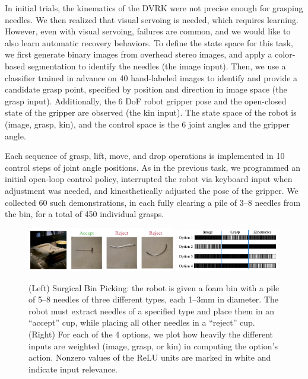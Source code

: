 In initial trials, the kinematics of the DVRK were not precise enough for grasping needles.
We then realized that visual servoing is needed, which requires learning.
However, even with visual servoing, failures are common, and we would like to also learn automatic recovery behaviors. 
To define the state space for this task, we first generate binary images from overhead stereo images, and apply a color-based segmentation to identify the needles (the \textsf{image} input).
Then, we use a classifier trained in advance on 40 hand-labeled images to identify and provide a candidate grasp point, specified by position and direction in image space (the \textsf{grasp} input). 
Additionally, the 6 DoF robot gripper pose and the open-closed state of the gripper are observed (the \textsf{kin} input).
The state space of the robot is (\textsf{image}, \textsf{grasp}, \textsf{kin}), and the control space is the 6 joint angles and the gripper angle.

Each sequence of grasp, lift, move, and drop operations is implemented in 10 control steps of joint angle positions.
As in the previous task,  we programmed an initial open-loop control policy, interrupted the robot via keyboard input when adjustment was needed, and kinesthetically adjusted the pose of the gripper. 
We collected 60 such demonstrations, in each fully clearing a pile of 3--8 needles from the bin, for a total of 450 individual grasps.


\begin{figure}[ht!]
    \includegraphics[width=0.58\textwidth]{ddco-experiments/needle-sorting2.png}
    \includegraphics[width=0.4\textwidth]{ddco-experiments/ReLU-dvrk-options.png}
    \caption{(Left) Surgical Bin Picking: the robot is given a foam bin with a pile of 5--8 needles of three different types, each 1--3mm in diameter. The robot must extract needles of a specified type and place them in an ``accept'' cup, while placing all other needles in a ``reject'' cup. (Right) For each of the 4 options, we plot how heavily the different inputs are weighted (\textsf{image}, \textsf{grasp}, or \textsf{kin}) in computing the option's action. Nonzero values of the ReLU units are marked in white and indicate input relevance. \label{fig:dvrkexp4}} 
\end{figure}


